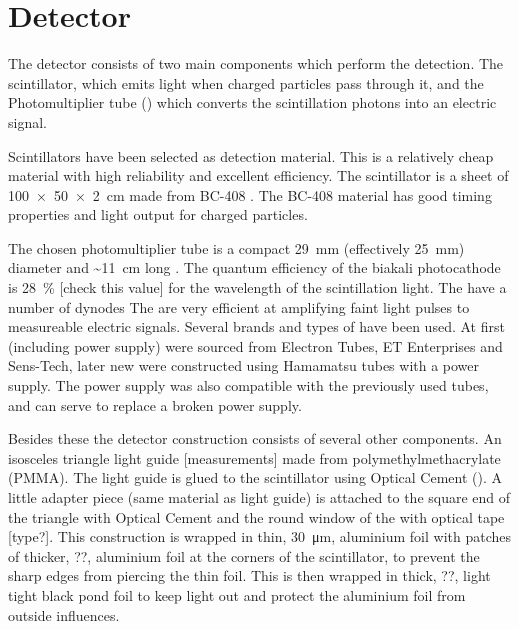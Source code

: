 \section{Detector}

The detector consists of two main components which perform the detection. The scintillator, which emits light when charged particles pass through it, and the Photomultiplier tube (\pmt) which converts the scintillation photons into an electric signal.

Scintillators have been selected as detection material. This is a relatively cheap material with high reliability and excellent efficiency. The scintillator is a sheet of \SI[product-units=power]{100 x 50 x 2}{\centi\meter} made from BC-408 \cite{bc408}. The BC-408 material has good timing properties and light output for charged particles.

The chosen photomultiplier tube \cite{et:pmt} is a compact \SI{29}{\milli\meter} (effectively \SI{25}{\milli\meter}) diameter and \SI{~11}{\centi\meter} long \pmt. The quantum efficiency of the biakali photocathode is \SI{28}{\percent} [check this value] for the wavelength of the scintillation light. The \pmts have a number of dynodes The \pmts are very efficient at amplifying faint light pulses to measureable electric signals. Several brands and types of \pmts have been used. At first \pmts (including power supply) were sourced from Electron Tubes, ET Enterprises and Sens-Tech, later new \pmts were constructed using Hamamatsu tubes with a \nikhef power supply. The \nikhef power supply was also compatible with the previously used tubes, and can serve to replace a broken power supply.

Besides these the detector construction consists of several other components. An isosceles triangle light guide [measurements] made from polymethylmethacrylate (PMMA). The light guide is glued to the scintillator using Optical Cement (\cite{bc600}). A little adapter piece (same material as light guide) is attached to the square end of the triangle with Optical Cement and the round window of the \pmt with optical tape [type?]. This construction is wrapped in thin, \SI{30}{\micro\meter}, aluminium foil with patches of thicker, ??, aluminium foil at the corners of the scintillator, to prevent the sharp edges from piercing the thin foil. This is then wrapped in thick, ??, light tight black pond foil to keep light out and protect the aluminium foil from outside influences.

